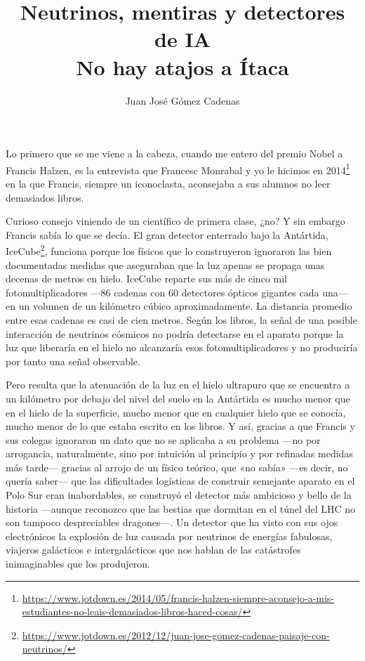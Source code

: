 \documentclass[11pt,a4paper]{article}
\title{Neutrinos, mentiras y detectores de IA\\[0.4em]\large No hay atajos a Ítaca}
\author{Juan José Gómez Cadenas}
\date{}
\begin{document}
\maketitle

Lo primero que se me viene a la cabeza, cuando me entero del premio Nobel a Francis Halzen, es la entrevista que Francesc Monrabal y yo le hicimos en 2014\footnote{\url{https://www.jotdown.es/2014/05/francis-halzen-siempre-aconsejo-a-mis-estudiantes-no-leais-demasiados-libros-haced-cosas/}} en la que Francis, siempre un iconoclasta, aconsejaba a sus alumnos no leer demasiados libros.

Curioso consejo viniendo de un científico de primera clase, ¿no? Y sin embargo Francis sabía lo que se decía. El gran detector enterrado bajo la Antártida, IceCube\footnote{\url{https://www.jotdown.es/2012/12/juan-jose-gomez-cadenas-paisaje-con-neutrinos/}}, funciona porque los físicos que lo construyeron ignoraron las bien documentadas medidas que aseguraban que la luz apenas se propaga unas decenas de metros en hielo. IceCube reparte sus más de cinco mil fotomultiplicadores ---86 cadenas con 60 detectores ópticos gigantes cada una--- en un volumen de un kilómetro cúbico aproximadamente. La distancia promedio entre esas cadenas es casi de cien metros. Según los libros, la señal de una posible interacción de neutrinos cósmicos no podría detectarse en el aparato porque la luz que liberaría en el hielo no alcanzaría esos fotomultiplicadores y no produciría por tanto una señal observable.

Pero resulta que la atenuación de la luz en el hielo ultrapuro que se encuentra a un kilómetro por debajo del nivel del suelo en la Antártida es mucho menor que en el hielo de la superficie, mucho menor que en cualquier hielo que se conocía, mucho menor de lo que estaba escrito en los libros. Y así, gracias a que Francis y sus colegas ignoraron un dato que no se aplicaba a su problema ---no por arrogancia, naturalmente, sino por intuición al principio y por refinadas medidas más tarde--- gracias al arrojo de un físico teórico, que «no sabía» ---es decir, no quería saber--- que las dificultades logísticas de construir semejante aparato en el Polo Sur eran inabordables, se construyó el detector más ambicioso y bello de la historia ---aunque reconozco que las bestias que dormitan en el túnel del LHC no son tampoco despreciables dragones---. Un detector que ha visto con sus ojos electrónicos la explosión de luz causada por neutrinos de energías fabulosas, viajeros galácticos e intergalácticos que nos hablan de las catástrofes inimaginables que los produjeron.
\end{document}
